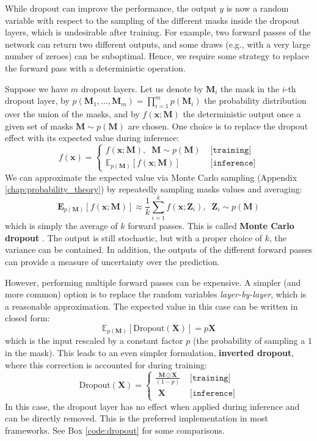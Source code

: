While dropout can improve the performance, the output $y$ is now a random variable with respect to the sampling of the different masks inside the dropout layers, which is undesirable after training. For example, two forward passes of the network can return two different outputs, and some draws (e.g., with a very large number of zeroes) can be suboptimal. Hence, we require some strategy to replace the forward pass with a deterministic operation. 

Suppose we have $m$ dropout layers. Let us denote by $\mathbf{M}_i$ the mask in the $i$-th dropout layer, by $p(\mathbf{M}_1, \ldots, \mathbf{M}_m) = \prod_{i=1}^m p(\mathbf{M}_i)$ the probability distribution over the union of the masks, and by $f(\mathbf{x}; \mathbf{M})$ the deterministic output once a given set of masks $\mathbf{M} \sim p(\mathbf{M})$ are chosen. One choice is to replace the dropout effect with its expected value during inference:
%
$$
f(\mathbf{x})=\begin{cases} f(\mathbf{x}; \mathbf{M}), \;\; \mathbf{M}\sim p(\mathbf{M}) & \texttt{ [training]} \\ \mathbb{E}_{p(\mathbf{M})}\left[f(\mathbf{x}; \mathbf{M})\right]  & \texttt{ [inference]}\end{cases}
$$
%
We can approximate the expected value via Monte Carlo sampling (Appendix \ref{chap:probability_theory}) by repeatedly sampling masks values and averaging:
%
$$
\mathbf{E}_{p(\mathbf{M})}\left[f(\mathbf{x}; \mathbf{M})\right] \approx \frac{1}{k}\sum_{i=1}^k f(\mathbf{x}; \mathbf{Z}_i),\;\; \mathbf{Z}_i \sim p(\mathbf{M})
$$
%
which is simply the average of $k$ forward passes. This is called \textbf{Monte Carlo dropout} \cite{gal2016dropout}. The output is still stochastic, but with a proper choice of $k$, the variance can be contained. In addition, the outputs of the different forward passes can provide a measure of uncertainty over the prediction. 

However, performing multiple forward passes can be expensive. A simpler (and more common) option is to replace the random variables \textit{layer-by-layer}, which is a reasonable approximation. The expected value in this case can be written in closed form:
%
$$
\mathbb{E}_{p(\mathbf{M})}\left[\text{Dropout}(\mathbf{X})\right]=p\mathbf{X}
$$
%
which is the input rescaled by a constant factor $p$ (the probability of sampling a $1$ in the mask). This leads to an even simpler formulation, \textbf{inverted dropout}, where this correction is accounted for during training:
%
$$
\text{Dropout}(\mathbf{X})=\begin{cases} \displaystyle\frac{\mathbf{M}\odot\mathbf{X}}{(1-p)} & \texttt{ [training]} \\ \,\,\mathbf{X}  & \texttt{ [inference]}\end{cases}
$$
%
In this case, the dropout layer has no effect when applied during inference and can be directly removed. This is the preferred implementation in most frameworks. See Box \ref{code:dropout} for some comparisons.

